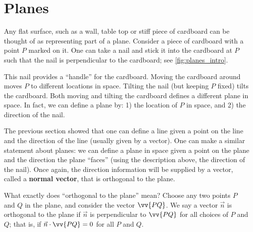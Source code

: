 \section{Planes}\label{sec:planes}

Any flat surface, such as a wall, table top or stiff piece of cardboard can be thought of as representing part of a plane. Consider a piece of cardboard with a point $P$ marked on it. One can take a nail and stick it into the cardboard at $P$ such that the nail is perpendicular to the cardboard; see \autoref{fig:planes_intro}.%

This nail provides a ``handle'' for the cardboard. Moving the cardboard around moves $P$ to different locations in space. Tilting the nail (but keeping $P$ fixed) tilts the cardboard. Both moving and tilting the cardboard defines a different plane in space. In fact, we can define a plane by: 1) the location of $P$ in space, and 2) the direction of the nail.

The previous section showed that one can define a line given a point on the line and the direction of the line (usually given by a vector). One can make a similar statement about planes: we can define a plane in space given a point on the plane and the direction the plane ``faces'' (using the description above, the direction of the nail). Once again, the direction information will be supplied by a vector, called a \textbf{normal vector}, that is orthogonal to the plane.

What exactly does ``orthogonal to the plane'' mean? Choose any two points $P$ and $Q$ in the plane, and consider the vector $\vv{PQ}$. We say a vector $\vec n$ is orthogonal to the plane if $\vec n$ is perpendicular to $\vv{PQ}$ for all choices of $P$ and $Q$; that is, if $\vec n\cdot \vv{PQ}=0$ for all $P$ and $Q$.


